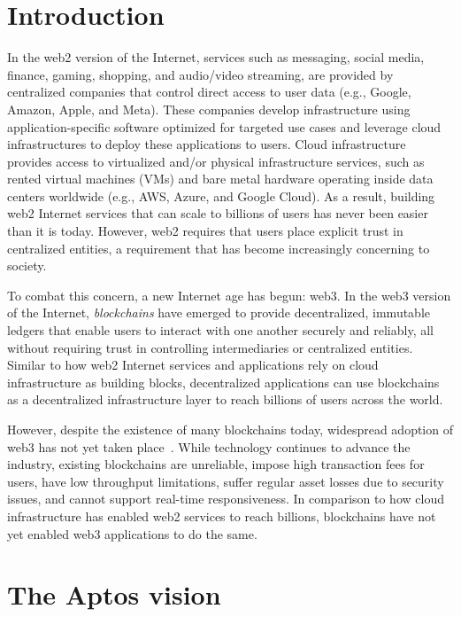 \documentclass{article}
\begin{document}
\section{Introduction}

In the web2 version of the Internet, services such as messaging, social media, finance, gaming, shopping, and audio/video streaming, are provided by centralized companies that control direct access to user data (e.g., Google, Amazon, Apple, and Meta). These companies develop infrastructure using application-specific software optimized for targeted use cases and leverage cloud infrastructures to deploy these applications to users. Cloud infrastructure provides access to virtualized and/or physical infrastructure services, such as rented virtual machines (VMs) and bare metal hardware operating inside data centers worldwide (e.g., AWS, Azure, and Google Cloud). As a result, building web2 Internet services that can scale to billions of users has never been easier than it is today. However, web2 requires that users place explicit trust in centralized entities, a requirement that has become increasingly concerning to society.

To combat this concern, a new Internet age has begun: web3. In the web3 version of the Internet, \emph{blockchains} have emerged to provide decentralized, immutable ledgers that enable users to interact with one another securely and reliably, all without requiring trust in controlling intermediaries or centralized entities. Similar to how web2 Internet services and applications rely on cloud infrastructure as building blocks, decentralized applications can use blockchains as a decentralized infrastructure layer to reach billions of users across the world.

However, despite the existence of many blockchains today, widespread adoption of web3 has not yet taken place~\cite{a16_state}. While technology continues to advance the industry, existing blockchains are  unreliable, impose high transaction fees for users, have low throughput limitations, suffer regular asset losses due to security issues, and cannot support real-time responsiveness. In comparison to how cloud infrastructure has enabled web2 services to reach billions, blockchains have not yet enabled web3 applications to do the same.

\section{The Aptos vision}
\end{document}
